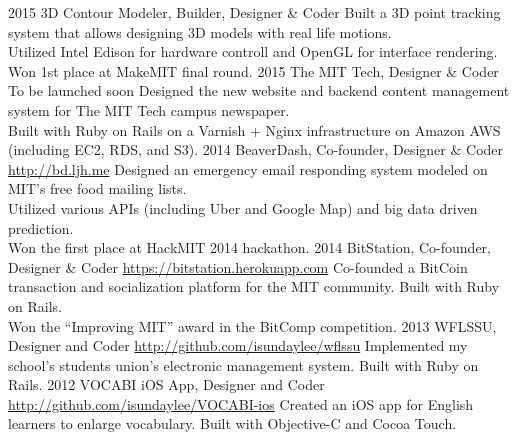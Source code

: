 \documentclass[print]{friggeri-cv} %
\begin{document}
\begin{entrylist}
  \entry
  {2015}
  {3D Contour Modeler, Builder, Designer \& Coder}
  {}
  {Built a 3D point tracking system that allows designing 3D models with real life motions. \\
  Utilized Intel Edison for hardware controll and OpenGL for interface rendering. \\
  Won 1st place at MakeMIT final round. }
  \entry
  {2015}
  {The MIT Tech, Designer \& Coder}
  {To be launched soon}
  {Designed the new website and backend content management system for The MIT Tech campus newspaper. \\
  Built with Ruby on Rails on a Varnish + Nginx infrastructure on Amazon AWS (including EC2, RDS, and S3). }
  \entry
  {2014}
  {BeaverDash, Co-founder, Designer \& Coder}
  {\href{http://bd.ljh.me}{http://bd.ljh.me}}
  {Designed an emergency email responding system modeled on MIT's free food mailing lists. \\
  Utilized various APIs (including Uber and Google Map) and big data driven prediction. \\
  Won the first place at HackMIT 2014 hackathon. }
  \entry
  {2014}
  {BitStation, Co-founder, Designer \& Coder}
  {\href{https://bitstation.herokuapp.com}{https://bitstation.herokuapp.com}}
  {Co-founded a BitCoin transaction and socialization platform for the MIT community. Built with Ruby on Rails. \\
  Won the ``Improving MIT'' award in the BitComp competition. }
  \entry
  {2013}
  {WFLSSU, Designer and Coder}
  {\href{http://github.com/isundaylee/wflssu}{http://github.com/isundaylee/wflssu}}
  {Implemented my school's students union's electronic management system. Built with Ruby on Rails.}
  \entry
  {2012}
  {VOCABI iOS App, Designer and Coder}
  {\href{http://github.com/isundaylee/VOCABI-ios}{http://github.com/isundaylee/VOCABI-ios}}
  {Created an iOS app for English learners to enlarge vocabulary. Built with Objective-C and Cocoa Touch.}
\end{entrylist}
\end{document}
